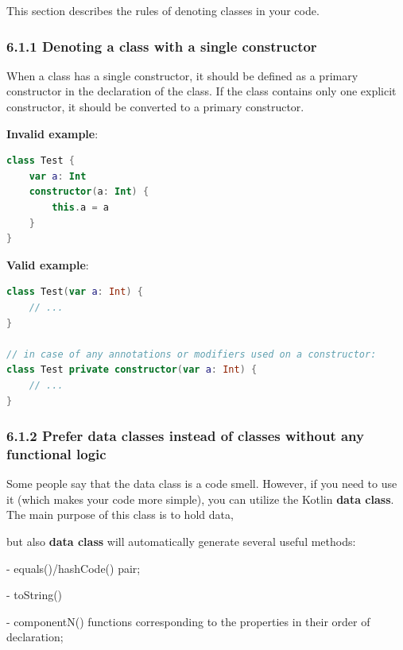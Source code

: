\label{sec:6.1}

This section describes the rules of denoting classes in your code.

\subsubsection*{\textbf{6.1.1  Denoting a class with a single constructor}}
\leavevmode\newline

\label{sec:6.1.1}

When a class has a single constructor, it should be defined as a primary constructor in the declaration of the class. If the class contains only one explicit constructor, it should be converted to a primary constructor.



\textbf{Invalid example}:

\begin{lstlisting}[language=Kotlin]
class Test {
    var a: Int
    constructor(a: Int) {
        this.a = a
    }
}
\end{lstlisting}


\textbf{Valid example}:

\begin{lstlisting}[language=Kotlin]
class Test(var a: Int) { 
    // ...
}

// in case of any annotations or modifiers used on a constructor:
class Test private constructor(var a: Int) { 
    // ...
}
\end{lstlisting}


\subsubsection*{\textbf{6.1.2 Prefer data classes instead of classes without any functional logic}}
\leavevmode\newline

\label{sec:6.1.2}

Some people say that the data class is a code smell. However, if you need to use it (which makes your code more simple), you can utilize the Kotlin \textbf{data class}. The main purpose of this class is to hold data,

but also \textbf{data class} will automatically generate several useful methods:

- equals()/hashCode() pair;

- toString()

- componentN() functions corresponding to the properties in their order of declaration;


